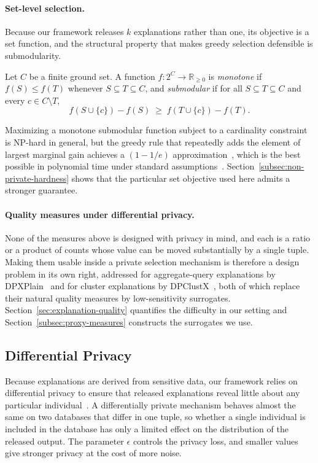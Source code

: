 \paragraph{Set-level selection.}
Because our framework releases $k$ explanations rather than one, its objective is a
set function, and the structural property that makes greedy selection defensible is
submodularity.

\begin{definition}
\label{def:submodular}
Let $C$ be a finite ground set. A function $f:2^{C}\rightarrow\mathbb{R}_{\ge 0}$ is
\emph{monotone} if $f(S)\le f(T)$ whenever $S\subseteq T\subseteq C$, and
\emph{submodular} if for all $S\subseteq T\subseteq C$ and every $c\in C\setminus T$,
\[
f(S\cup\{c\})-f(S) \;\ge\; f(T\cup\{c\})-f(T).
\]
\end{definition}

Maximizing a monotone submodular function subject to a cardinality constraint is
NP-hard in general, but the greedy rule that repeatedly adds the element of largest
marginal gain achieves a $(1-1/e)$ approximation~\cite{NemhauserWF78}, which is the
best possible in polynomial time under standard
assumptions~\cite{Feige98}.
Section~\ref{subsec:non-private-hardness} shows that the particular set objective
used here admits a stronger guarantee.

\paragraph{Quality measures under differential privacy.}
None of the measures above is designed with privacy in mind, and each is a ratio or
a product of counts whose value can be moved substantially by a single tuple.
Making them usable inside a private selection mechanism is therefore a design
problem in its own right, addressed for aggregate-query explanations by
DPXPlain~\cite{TaoGMR22} and for cluster explanations by
DPClustX~\cite{DPClustX}, both of which replace their natural quality measures by
low-sensitivity surrogates.
Section~\ref{sec:explanation-quality} quantifies the difficulty in our setting and
Section~\ref{subsec:proxy-measures} constructs the surrogates we use.

\subsection{Differential Privacy}
\label{subsec:prelim-dp}
Because explanations are derived from sensitive data, our framework relies on
differential privacy to ensure that released explanations reveal little about any
particular individual~\cite{TheAlgFoundDP2014}. A differentially private mechanism
behaves almost the same on two databases that differ in one tuple, so whether a
single individual is included in the database has only a limited effect on the
distribution of the released output. The parameter $\epsilon$ controls the privacy
loss, and smaller values give stronger privacy at the cost of more noise.

